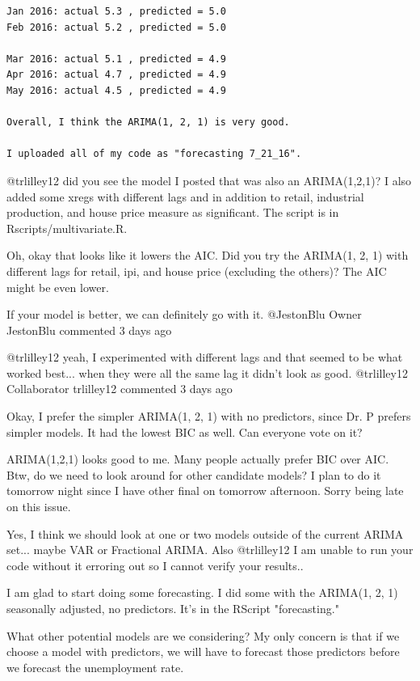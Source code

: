 \documentclass[twoside,twocolumn]{article}
\begin{document}
\begin{verbatim}
Jan 2016: actual 5.3 , predicted = 5.0
Feb 2016: actual 5.2 , predicted = 5.0

Mar 2016: actual 5.1 , predicted = 4.9
Apr 2016: actual 4.7 , predicted = 4.9
May 2016: actual 4.5 , predicted = 4.9

Overall, I think the ARIMA(1, 2, 1) is very good.

I uploaded all of my code as "forecasting 7_21_16".

\end{verbatim}

@trlilley12 did you see the model I posted that was also an ARIMA(1,2,1)? I also added some xregs with different lags and in addition to retail, industrial production, and house price measure as significant. The script is in Rscripts/multivariate.R. 



Oh, okay that looks like it lowers the AIC. Did you try the ARIMA(1, 2, 1) with different lags for retail, ipi, and house price (excluding the others)? The AIC might be even lower.

If your model is better, we can definitely go with it.
@JestonBlu
Owner
JestonBlu commented 3 days ago

@trlilley12 yeah, I experimented with different lags and that seemed to be what worked best... when they were all the same lag it didn't look as good.
@trlilley12
Collaborator
trlilley12 commented 3 days ago

Okay, I prefer the simpler ARIMA(1, 2, 1) with no predictors, since Dr. P prefers simpler models. It had the lowest BIC as well. Can everyone vote on it?

ARIMA(1,2,1) looks good to me. Many people actually prefer BIC over AIC. Btw, do we need to look around for other candidate models? I plan to do it tomorrow night since I have other final on tomorrow afternoon. Sorry being late on this issue.

Yes, I think we should look at one or two models outside of the current ARIMA set... maybe VAR or Fractional ARIMA. Also @trlilley12 I am unable to run your code without it erroring out so I cannot verify your results.. 



I am glad to start doing some forecasting. I did some with the ARIMA(1, 2, 1) seasonally adjusted, no predictors. It's in the RScript "forecasting."

What other potential models are we considering? My only concern is that if we choose a model with predictors, we will have to forecast those predictors before we forecast the unemployment rate.
\end{document}
